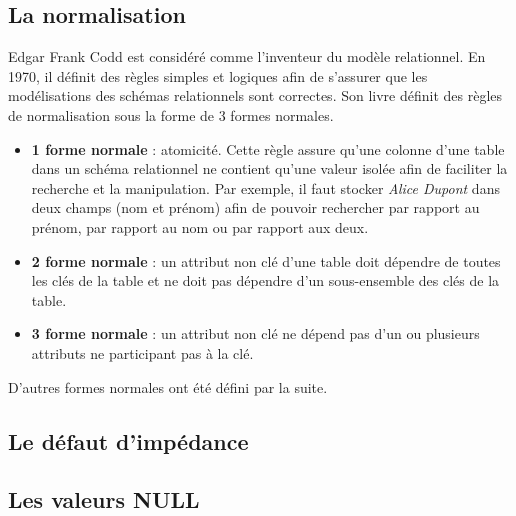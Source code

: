 \subsection{La normalisation}

    Edgar Frank Codd est considéré comme l'inventeur du modèle relationnel. En 1970, il définit des règles simples et logiques afin de s'assurer que les modélisations des schémas relationnels sont correctes\cite{Wikipedia_Edgar_Frank_Codd}. Son livre définit des règles de normalisation sous la forme de 3 formes normales.

    \begin{itemize}
      \item \textbf{1\iere{} forme normale} : atomicité. Cette règle assure qu'une colonne d'une table dans un schéma relationnel ne contient qu'une valeur isolée afin de faciliter la recherche et la manipulation. Par exemple, il faut stocker \textit{Alice Dupont} dans deux champs (nom et prénom) afin de pouvoir rechercher par rapport au prénom, par rapport au nom ou par rapport aux deux.
      \item \textbf{2\ieme{} forme normale} : un attribut non clé d'une table doit dépendre de toutes les clés de la table et ne doit pas dépendre d'un sous-ensemble des clés de la table.
      \item \textbf{3\ieme{} forme normale} : un attribut non clé ne dépend pas d'un ou plusieurs attributs ne participant pas à la clé.
    \end{itemize}

    D'autres formes normales ont été défini par la suite.

\subsection{Le défaut d'impédance}
\subsection{Les valeurs NULL}
